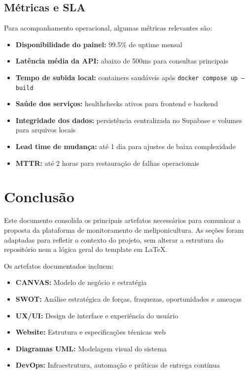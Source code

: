\documentclass[11pt,a4paper]{article}
\begin{document}
\subsection{Métricas e SLA}

Para acompanhamento operacional, algumas métricas relevantes são:

\begin{itemize}
    \item \textbf{Disponibilidade do painel:} 99.5\% de uptime mensal
    \item \textbf{Latência média da API:} abaixo de 500ms para consultas principais
    \item \textbf{Tempo de subida local:} containers saudáveis após \texttt{docker compose up --build}
    \item \textbf{Saúde dos serviços:} healthchecks ativos para frontend e backend
    \item \textbf{Integridade dos dados:} persistência centralizada no Supabase e volumes para arquivos locais
    \item \textbf{Lead time de mudança:} até 1 dia para ajustes de baixa complexidade
    \item \textbf{MTTR:} até 2 horas para restauração de falhas operacionais
\end{itemize}

\newpage
\section*{Conclusão}

Este documento consolida os principais artefatos necessários para comunicar a proposta da plataforma de monitoramento de meliponicultura. As seções foram adaptadas para refletir o contexto do projeto, sem alterar a estrutura do repositório nem a lógica geral do template em \LaTeX.

Os artefatos documentados incluem:
\begin{itemize}
    \item \textbf{CANVAS:} Modelo de negócio e estratégia
    \item \textbf{SWOT:} Análise estratégica de forças, fraquezas, oportunidades e ameaças
    \item \textbf{UX/UI:} Design de interface e experiência do usuário
    \item \textbf{Website:} Estrutura e especificações técnicas web
    \item \textbf{Diagramas UML:} Modelagem visual do sistema
    \item \textbf{DevOps:} Infraestrutura, automação e práticas de entrega contínua
\end{itemize}
\end{document}
